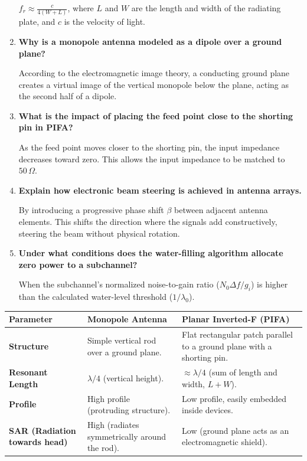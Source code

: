 \documentclass[12pt,a4paper]{article}
\newcommand{\Q}[1]{\textbf{#1}\par\noindent\ignorespaces}
\renewcommand{\arraystretch}{1.45}
\begin{document}
\begin{tcolorbox}[exambox, title={\textbf{Frequently Asked / Viva Questions}}]
\begin{enumerate}[topsep=0pt, label=\textbf{Q\arabic*.}, itemsep=5pt]
    $f_r \approx \frac{c}{4(W+L)}$, where $L$ and $W$ are the length and width of the radiating plate, and $c$ is the velocity of light.
  \item \Q{Why is a monopole antenna modeled as a dipole over a ground plane?}
    According to the electromagnetic image theory, a conducting ground plane creates a virtual image of the vertical monopole below the plane, acting as the second half of a dipole.
  \item \Q{What is the impact of placing the feed point close to the shorting pin in PIFA?}
    As the feed point moves closer to the shorting pin, the input impedance decreases toward zero. This allows the input impedance to be matched to $50\,\Omega$.
  \item \Q{Explain how electronic beam steering is achieved in antenna arrays.}
    By introducing a progressive phase shift $\beta$ between adjacent antenna elements. This shifts the direction where the signals add constructively, steering the beam without physical rotation.
  \item \Q{Under what conditions does the water-filling algorithm allocate zero power to a subchannel?}
    When the subchannel's normalized noise-to-gain ratio ($N_0 \Delta f / g_i$) is higher than the calculated water-level threshold ($1/\lambda_0$).
\end{enumerate}
\end{tcolorbox}

\begin{tcolorbox}[tikzbox, title={Comparison of Monopole and PIFA Antennas}]
\renewcommand{\arraystretch}{1.4}
\par\noindent
{\renewcommand{\arraystretch}{1.55}%
\begin{tabularx}{\linewidth}{|B{3.0cm}|Y|Y|}\hline
\textbf{Parameter} & \textbf{\color{myteal}Monopole Antenna} & \textbf{\color{myred}Planar Inverted-F (PIFA)} \\[4pt]
\hline
\textbf{Structure} & Simple vertical rod over a ground plane. & Flat rectangular patch parallel to a ground plane with a shorting pin. \\[4pt]
\hline
\textbf{Resonant Length} & $\lambda/4$ (vertical height). & $\approx \lambda/4$ (sum of length and width, $L+W$). \\[4pt]
\hline
\textbf{Profile} & High profile (protruding structure). & Low profile, easily embedded inside devices. \\[4pt]
\hline
\textbf{SAR (Radiation towards head)} & High (radiates symmetrically around the rod). & Low (ground plane acts as an electromagnetic shield). \\[4pt]
\hline
\end{tabularx}
}
\end{tcolorbox}
\end{document}
